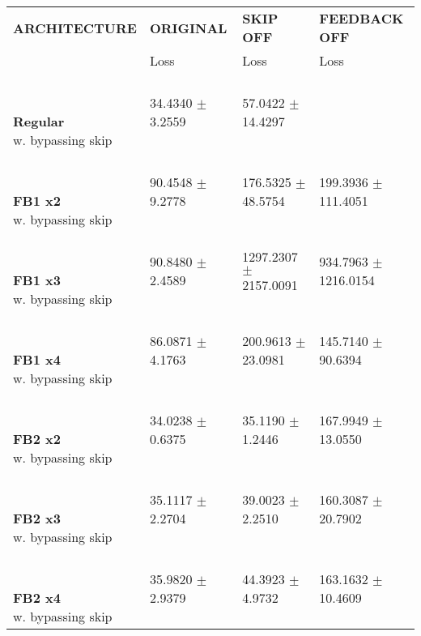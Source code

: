 
\begin{table}[ht]
    \centering
    \begin{tabular}{|>{\columncolor{gray!05}}l|l|l|l|}
        \hline
        \rowcolor{gray!20}
        \textbf{\footnotesize ARCHITECTURE} & \textbf{\footnotesize ORIGINAL} & \textbf{\footnotesize SKIP OFF} & \textbf{\footnotesize FEEDBACK OFF} \\

        \rowcolor{gray!20}
        & {\footnotesize Loss} & {\footnotesize Loss} & {\footnotesize Loss} \\
        \hline
\shortstack[l]{\\ {} \\ \textbf{Regular}\\{w. bypassing skip}} & 34.4340 $\pm$ 3.2559 & 57.0422 $\pm$ 14.4297 &  \\
 \hline 
\shortstack[l]{\\ {} \\ \textbf{FB1 x2}\\{w. bypassing skip}} & 90.4548 $\pm$ 9.2778 & 176.5325 $\pm$ 48.5754 & 199.3936 $\pm$ 111.4051 \\
 \hline 
\shortstack[l]{\\ {} \\ \textbf{FB1 x3}\\{w. bypassing skip}} & 90.8480 $\pm$ 2.4589 & 1297.2307 $\pm$ 2157.0091 & 934.7963 $\pm$ 1216.0154 \\
 \hline 
\shortstack[l]{\\ {} \\ \textbf{FB1 x4}\\{w. bypassing skip}} & 86.0871 $\pm$ 4.1763 & 200.9613 $\pm$ 23.0981 & 145.7140 $\pm$ 90.6394 \\
 \hline 
\shortstack[l]{\\ {} \\ \textbf{FB2 x2}\\{w. bypassing skip}} & 34.0238 $\pm$ 0.6375 & 35.1190 $\pm$ 1.2446 & 167.9949 $\pm$ 13.0550 \\
 \hline 
\shortstack[l]{\\ {} \\ \textbf{FB2 x3}\\{w. bypassing skip}} & 35.1117 $\pm$ 2.2704 & 39.0023 $\pm$ 2.2510 & 160.3087 $\pm$ 20.7902 \\
 \hline 
\shortstack[l]{\\ {} \\ \textbf{FB2 x4}\\{w. bypassing skip}} & 35.9820 $\pm$ 2.9379 & 44.3923 $\pm$ 4.9732 & 163.1632 $\pm$ 10.4609 \\

\end{tabular}
\end{table}
